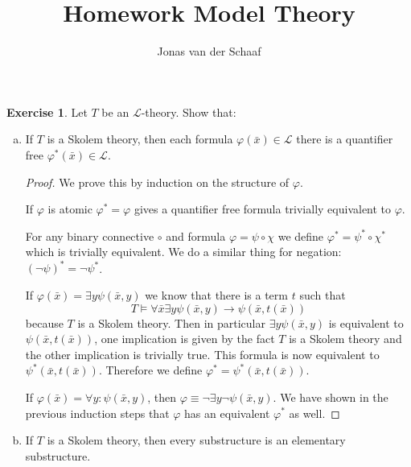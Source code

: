 \documentclass{article}
\title{Homework Model Theory}
\author{Jonas van der Schaaf}
\date{}
\newcommand{\lang}{\mathscr{L}}
\theoremstyle{definition}
\newtheorem{question}{Exercise}
\begin{document}
\maketitle

\begin{question}
    Let \(T\) be an \(\mathscr{L}\)-theory. Show that:
    \begin{enumerate}[(a)]
        \item If \(T\) is a Skolem theory, then each formula
              \(\varphi(\bar{x})\in\lang\) there is a quantifier free
              \(\varphi^{*}(\bar{x})\in\lang\).

              \begin{proof}
                  We prove this by induction on the structure of \(\varphi\).

                  If \(\varphi\) is atomic \(\varphi^{*}=\varphi\) gives a
                  quantifier free formula trivially equivalent to \(\varphi\).

                  For any binary connective \(\circ\) and formula
                  \(\varphi=\psi\circ\chi\) we define
                  \(\varphi^{*}=\psi^{*}\circ\chi^{*}\) which is trivially
                  equivalent. We do a similar thing for negation:
                  \((\neg\psi)^{*}=\neg\psi^{*}\).

                  If \(\varphi(\bar{x})=\exists y\psi(\bar{x},y)\) we know that there
                  is a term \(t\) such that
                  \[
                      T\models\forall\bar{x}\exists y\psi(\bar{x},y)\to\psi(\bar{x},t(\bar{x}))
                  \]
                  because \(T\) is a Skolem theory. Then in particular \(\exists
                  y\psi(\bar{x},y)\) is equivalent to
                  \(\psi(\bar{x},t(\bar{x}))\), one implication is given by the
                  fact \(T\) is a Skolem theory and the other implication is
                  trivially true. This formula is now equivalent to
                  \(\psi^{*}(\bar{x},t(\bar{x}))\). Therefore we define
                  \(\varphi^{*}=\psi^{*}(\bar{x},t(\bar{x}))\).

                  If \(\varphi(\bar{x})=\forall y:\psi(\bar{x},y)\), then
                  \(\varphi\equiv\neg\exists y\neg\psi(\bar{x},y)\). We have
                  shown in the previous induction steps that
                  \(\varphi\) has an equivalent \(\varphi^{*}\) as well.
              \end{proof}

        \item If \(T\) is a Skolem theory, then every substructure is an
              elementary substructure.


\end{enumerate}
\end{question}
\end{document}
